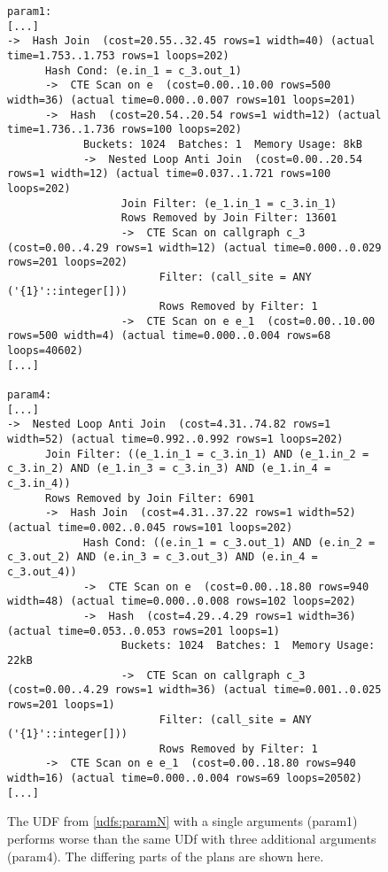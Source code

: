 \begin{figure}
    \centering
    \begin{verbatim}
param1:
[...]
->  Hash Join  (cost=20.55..32.45 rows=1 width=40) (actual time=1.753..1.753 rows=1 loops=202)
      Hash Cond: (e.in_1 = c_3.out_1)
      ->  CTE Scan on e  (cost=0.00..10.00 rows=500 width=36) (actual time=0.000..0.007 rows=101 loops=201)
      ->  Hash  (cost=20.54..20.54 rows=1 width=12) (actual time=1.736..1.736 rows=100 loops=202)
            Buckets: 1024  Batches: 1  Memory Usage: 8kB
            ->  Nested Loop Anti Join  (cost=0.00..20.54 rows=1 width=12) (actual time=0.037..1.721 rows=100 loops=202)
                  Join Filter: (e_1.in_1 = c_3.in_1)
                  Rows Removed by Join Filter: 13601
                  ->  CTE Scan on callgraph c_3  (cost=0.00..4.29 rows=1 width=12) (actual time=0.000..0.029 rows=201 loops=202)
                        Filter: (call_site = ANY ('{1}'::integer[]))
                        Rows Removed by Filter: 1
                  ->  CTE Scan on e e_1  (cost=0.00..10.00 rows=500 width=4) (actual time=0.000..0.004 rows=68 loops=40602)
[...]

param4:
[...]
->  Nested Loop Anti Join  (cost=4.31..74.82 rows=1 width=52) (actual time=0.992..0.992 rows=1 loops=202)
      Join Filter: ((e_1.in_1 = c_3.in_1) AND (e_1.in_2 = c_3.in_2) AND (e_1.in_3 = c_3.in_3) AND (e_1.in_4 = c_3.in_4))
      Rows Removed by Join Filter: 6901
      ->  Hash Join  (cost=4.31..37.22 rows=1 width=52) (actual time=0.002..0.045 rows=101 loops=202)
            Hash Cond: ((e.in_1 = c_3.out_1) AND (e.in_2 = c_3.out_2) AND (e.in_3 = c_3.out_3) AND (e.in_4 = c_3.out_4))
            ->  CTE Scan on e  (cost=0.00..18.80 rows=940 width=48) (actual time=0.000..0.008 rows=102 loops=202)
            ->  Hash  (cost=4.29..4.29 rows=1 width=36) (actual time=0.053..0.053 rows=201 loops=1)
                  Buckets: 1024  Batches: 1  Memory Usage: 22kB
                  ->  CTE Scan on callgraph c_3  (cost=0.00..4.29 rows=1 width=36) (actual time=0.001..0.025 rows=201 loops=1)
                        Filter: (call_site = ANY ('{1}'::integer[]))
                        Rows Removed by Filter: 1
      ->  CTE Scan on e e_1  (cost=0.00..18.80 rows=940 width=16) (actual time=0.000..0.004 rows=69 loops=20502)
[...]

    \end{verbatim}
    \caption{The UDF from \autoref{udfs:paramN} with a single arguments (param1) performs worse than the same UDf with three additional arguments (param4). The differing parts of the plans are shown here.}
    \label{plan:paramN}
\end{figure}